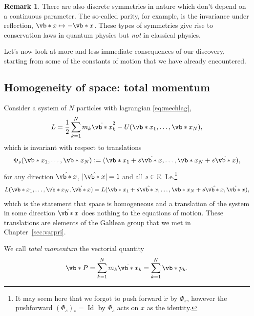 \documentclass[english,fontsize=11pt,paper=b5]{scrbook}
\numberwithin{equation}{chapter}
\DeclareMathOperator{\Id}{Id}
\DeclareMathOperator{\Id}{Id}
\theoremstyle{definition}
\newtheorem{remark}{Remark}[chapter]
\begin{document}
    \begin{remark}
      There are also discrete symmetries in nature which don't depend on a continuous parameter. The so-called parity, for example, is the invariance under reflection, $\vb*{x} \mapsto -\vb*{x}$.
      These types of symmetries give rise to conservation laws in quantum physics but \emph{not} in classical physics.
    \end{remark}

    Let's now look at more and less immediate consequences of our discovery, starting from some of the constants of motion that we have already encountered.

    \subsection{Homogeneity of space: total momentum}

    Consider a system of $N$ particles with lagrangian \eqref{eq:mechlag},
    \begin{equation}
      L = \frac12 \sum_{k=1}^N m_k \dot{\vb*{x}}_k^2 - U(\vb*{x}_1, \ldots, \vb*{x}_N),
    \end{equation}
    which is invariant with respect to translations
    \begin{equation}
      \Phi_s(\vb*{x}_1, \ldots, \vb*{x}_N) := (\vb*{x}_1 + s \hat{\vb*{x}},\ldots, \vb*{x}_N + s \hat{\vb*{x}}),
    \end{equation}
    for any direction $\hat{\vb*{x}}$, $|\hat{\vb*{x}}|=1$ and all $s\in\mathbb{R}$. I.e.\footnote{It may seem here that we forgot to push forward $\dot x$ by $\Phi_s$, however the pushforward $(\Phi_s)_* = \Id$ by $\Phi_s$ acts on $\dot x$ as the identity.}
    \begin{equation}
      L(\vb*{x}_1, \ldots, \vb*{x}_N, \dot{\vb*{x}}) = L(\vb*{x}_1 + s \hat{\vb*{x}}, \ldots, \vb*{x}_N + s \hat{\vb*{x}}, \dot{\vb*{x}}),
    \end{equation}
    which is the statement that space is homogeneous and a translation of the system in some direction $\hat{\vb*{x}}$ does nothing to the equations of motion. These translations are elements of the Galilean group that we met in Chapter~\ref{sec:varpri}.

    We call \emph{total momentum} the vectorial quantity
    \begin{equation}
      \vb*{P} = \sum_{k=1}^N m_k \dot{\vb*{x}}_k = \sum_{k=1}^N \vb*{p}_k.
    \end{equation}
\end{document}
